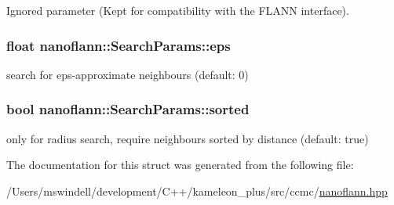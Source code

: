 Ignored parameter (Kept for compatibility with the F\-L\-A\-N\-N interface). 

\hypertarget{structnanoflann_1_1_search_params_a64b9e7c56bbb743694f6188f616a94cc}{
\subsubsection[{eps}]{\setlength{\rightskip}{0pt plus 5cm}float nanoflann\-::\-Search\-Params\-::eps}}\label{structnanoflann_1_1_search_params_a64b9e7c56bbb743694f6188f616a94cc}


search for eps-\/approximate neighbours (default\-: 0) 

\hypertarget{structnanoflann_1_1_search_params_a5126d5f71f1c9163c6a581776a0e9466}{
\subsubsection[{sorted}]{\setlength{\rightskip}{0pt plus 5cm}bool nanoflann\-::\-Search\-Params\-::sorted}}\label{structnanoflann_1_1_search_params_a5126d5f71f1c9163c6a581776a0e9466}


only for radius search, require neighbours sorted by distance (default\-: true) 



The documentation for this struct was generated from the following file\-:\begin{DoxyCompactItemize}
\item 
/\-Users/mswindell/development/\-C++/kameleon\-\_\-plus/src/ccmc/\hyperlink{nanoflann_8hpp}{nanoflann.\-hpp}\end{DoxyCompactItemize}
